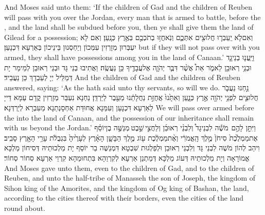 {And Moses said unto them: ‘If the children of Gad and the children of Reuben will pass with you over the Jordan, every man that is armed to battle, before the \lord, and the land shall be subdued before you, then ye shall give them the land of Gilead for a possession;}{}
{וְאִם\maqqaf לֹ֧א יַֽעַבְר֛וּ חֲלוּצִ֖ים אִתְּכֶ֑ם וְנֹֽאחֲז֥וּ בְתֹכְכֶ֖ם בְּאֶ֥רֶץ כְּנָֽעַן׃}
{וְאִם לָא יִעְבְּרוּן מְזָרְזִין עִמְּכוֹן וְיַחְסְנוּן בֵּינֵיכוֹן בְּאַרְעָא דִּכְנָעַן׃}
{but if they will not pass over with you armed, they shall have possessions among you in the land of Canaan.’}{}
{וַיַּֽעֲנ֧וּ בְנֵי\maqqaf גָ֛ד וּבְנֵ֥י רְאוּבֵ֖ן לֵאמֹ֑ר אֵת֩ אֲשֶׁ֨ר דִּבֶּ֧ר יְהֹוָ֛ה אֶל\maqqaf עֲבָדֶ֖יךָ כֵּ֥ן נַעֲשֶֽׂה׃}
{וַאֲתִיבוּ בְנֵי גָּד וּבְנֵי רְאוּבֵן לְמֵימַר יָת דְּמַלֵּיל יְיָ לְעַבְדָךְ כֵּן נַעֲבֵיד׃}
{And the children of Gad and the children of Reuben answered, saying: ‘As the \lord\space hath said unto thy servants, so will we do.}{}
{נַ֣חְנוּ נַעֲבֹ֧ר חֲלוּצִ֛ים לִפְנֵ֥י יְהֹוָ֖ה אֶ֣רֶץ כְּנָ֑עַן וְאִתָּ֙נוּ֙ אֲחֻזַּ֣ת נַחֲלָתֵ֔נוּ מֵעֵ֖בֶר לַיַּרְדֵּֽן׃}
{נַחְנָא נִעְבַּר מְזָרְזִין קֳדָם עַמָּא דַּייָ לְאַרְעָא דִּכְנָעַן וְעִמַּנָא אֲחוּדַּת אַחְסָנְתַנָא מֵעִבְרָא לְיַרְדְּנָא׃}
{We will pass over armed before the \lord\space into the land of Canaan, and the possession of our inheritance shall remain with us beyond the Jordan.’}{}
{וַיִּתֵּ֣ן לָהֶ֣ם \pasek  מֹשֶׁ֡ה לִבְנֵי\maqqaf גָד֩ וְלִבְנֵ֨י רְאוּבֵ֜ן וְלַחֲצִ֣י \legarmeh  שֵׁ֣בֶט \legarmeh  מְנַשֶּׁ֣ה בֶן\maqqaf יוֹסֵ֗ף אֶת\maqqaf מַמְלֶ֙כֶת֙ סִיחֹן֙ מֶ֣לֶךְ הָֽאֱמֹרִ֔י וְאֶ֨ת\maqqaf מַמְלֶ֔כֶת ע֖וֹג מֶ֣לֶךְ הַבָּשָׁ֑ן הָאָ֗רֶץ לְעָרֶ֙יהָ֙ בִּגְבֻלֹ֔ת עָרֵ֥י הָאָ֖רֶץ סָבִֽיב׃}
{וִיהַב לְהוֹן מֹשֶׁה לִבְנֵי גָּד וְלִבְנֵי רְאוּבֵן וּלְפַלְגוּת שִׁבְטָא דִּמְנַשֶּׁה בַר יוֹסֵף יָת מַלְכוּתֵיהּ דְּסִיחוֹן מַלְכָּא אֱמוֹרָאָה וְיָת מַלְכוּתֵיהּ דְּעוֹג מַלְכָּא דְּמַתְנַן אַרְעָא לְקִרְוַהָא בִּתְחוּמַהָא קִרְוֵי אַרְעָא סְחוֹר סְחוֹר׃}
{And Moses gave unto them, even to the children of Gad, and to the children of Reuben, and unto the half-tribe of Manasseh the son of Joseph, the kingdom of Sihon king of the Amorites, and the kingdom of Og king of Bashan, the land, according to the cities thereof with their borders, even the cities of the land round about.}{}
